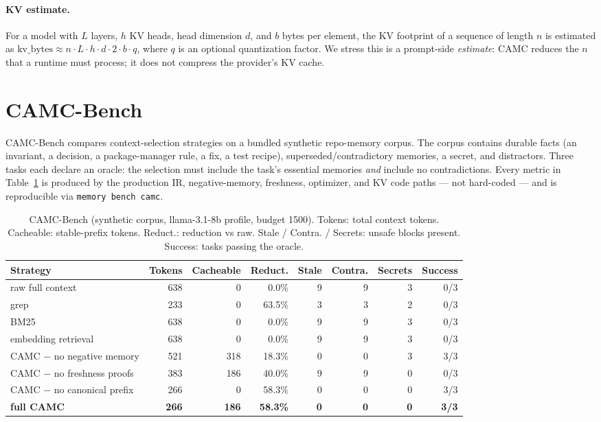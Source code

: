\documentclass[11pt]{article}
\begin{document}
\paragraph{KV estimate.} For a model with $L$ layers, $h$ KV heads, head dimension
$d$, and $b$ bytes per element, the KV footprint of a sequence of length $n$ is
estimated as $\text{kv\_bytes} \approx n \cdot L \cdot h \cdot d \cdot 2 \cdot b
\cdot q$, where $q$ is an optional quantization factor. We stress this is a
prompt-side \emph{estimate}: CAMC reduces the $n$ that a runtime must process; it
does not compress the provider's KV cache.

\section{CAMC-Bench}
\label{sec:bench}

CAMC-Bench compares context-selection strategies on a bundled synthetic
repo-memory corpus. The corpus contains durable facts (an invariant, a decision, a
package-manager rule, a fix, a test recipe), superseded/contradictory memories, a
secret, and distractors. Three tasks each declare an oracle: the selection must
include the task's essential memories \emph{and} include no contradictions. Every
metric in Table~\ref{tab:bench} is produced by the production IR, negative-memory,
freshness, optimizer, and KV code paths --- not hard-coded --- and is reproducible
via \texttt{memory bench camc}.

\begin{table}[h]
\centering
\small
\begin{tabular}{@{}lrrrrrrr@{}}
\toprule
\textbf{Strategy} & \textbf{Tokens} & \textbf{Cacheable} & \textbf{Reduct.} & \textbf{Stale} & \textbf{Contra.} & \textbf{Secrets} & \textbf{Success} \\
\midrule
raw full context & 638 & 0 & 0.0\% & 9 & 9 & 3 & 0/3 \\
grep & 233 & 0 & 63.5\% & 3 & 3 & 2 & 0/3 \\
BM25 & 638 & 0 & 0.0\% & 9 & 9 & 3 & 0/3 \\
embedding retrieval & 638 & 0 & 0.0\% & 9 & 9 & 3 & 0/3 \\
CAMC $-$ no negative memory & 521 & 318 & 18.3\% & 0 & 0 & 3 & 3/3 \\
CAMC $-$ no freshness proofs & 383 & 186 & 40.0\% & 9 & 9 & 0 & 0/3 \\
CAMC $-$ no canonical prefix & 266 & 0 & 58.3\% & 0 & 0 & 0 & 3/3 \\
\textbf{full CAMC} & \textbf{266} & \textbf{186} & \textbf{58.3\%} & \textbf{0} & \textbf{0} & \textbf{0} & \textbf{3/3} \\
\bottomrule
\end{tabular}
\caption{CAMC-Bench (synthetic corpus, llama-3.1-8b profile, budget 1500). Tokens:
total context tokens. Cacheable: stable-prefix tokens. Reduct.: reduction vs raw.
Stale / Contra. / Secrets: unsafe blocks present. Success: tasks passing the oracle.}
\label{tab:bench}
\end{table}
\end{document}
